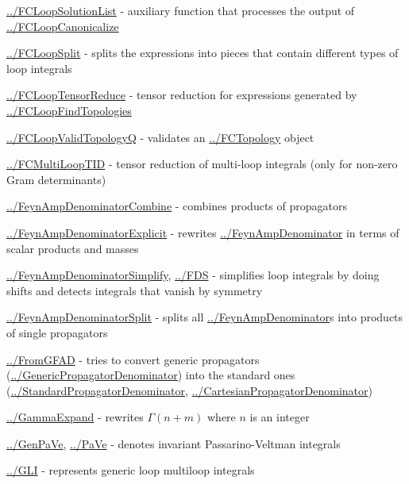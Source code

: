 \documentclass[../FeynCalcManual.tex]{subfiles}
\begin{document}
\begin{itemize}
{  \hyperlink{../fcloopsolutionlist}{../FCLoopSolutionList} - auxiliary
  function that processes the output of
  \hyperlink{../fcloopcanonicalize}{../FCLoopCanonicalize}
\item
  \hyperlink{../fcloopsplit}{../FCLoopSplit} - splits the expressions
  into pieces that contain different types of loop integrals
\item
  \hyperlink{../fclooptensorreduce}{../FCLoopTensorReduce} - tensor
  reduction for expressions generated by
  \hyperlink{../fcloopfindtopologies}{../FCLoopFindTopologies}
\item
  \hyperlink{../fcloopvalidtopologyq}{../FCLoopValidTopologyQ} -
  validates an \hyperlink{../fctopology}{../FCTopology} object
\item
  \hyperlink{../fcmultilooptid}{../FCMultiLoopTID} - tensor reduction of
  multi-loop integrals (only for non-zero Gram determinants)
\item
  \hyperlink{../feynampdenominatorcombine}{../FeynAmpDenominatorCombine}
  - combines products of propagators
\item
  \hyperlink{../feynampdenominatorexplicit}{../FeynAmpDenominatorExplicit}
  - rewrites \hyperlink{../feynampdenominator}{../FeynAmpDenominator} in
  terms of scalar products and masses
\item
  \hyperlink{../feynampdenominatorsimplify}{../FeynAmpDenominatorSimplify},
  \hyperlink{../fds}{../FDS} - simplifies loop integrals by doing shifts
  and detects integrals that vanish by symmetry
\item
  \hyperlink{../feynampdenominatorsplit}{../FeynAmpDenominatorSplit} -
  splits all \hyperlink{../feynampdenominator}{../FeynAmpDenominator}s
  into products of single propagators
\item
  \hyperlink{../fromgfad}{../FromGFAD} - tries to convert generic
  propagators
  (\hyperlink{../genericpropagatordenominator}{../GenericPropagatorDenominator})
  into the standard ones
  (\hyperlink{../standardpropagatordenominator}{../StandardPropagatorDenominator},
  \hyperlink{../cartesianpropagatordenominator}{../CartesianPropagatorDenominator})
\item
  \hyperlink{../gammaexpand}{../GammaExpand} - rewrites \(\Gamma(n+m)\)
  where \(n\) is an integer
\item
  \hyperlink{../genpave}{../GenPaVe}, \hyperlink{../pave}{../PaVe} -
  denotes invariant Passarino-Veltman integrals
\item
  \hyperlink{../gli}{../GLI} - represents generic loop multiloop
  integrals
}
\end{itemize}
\end{document}
